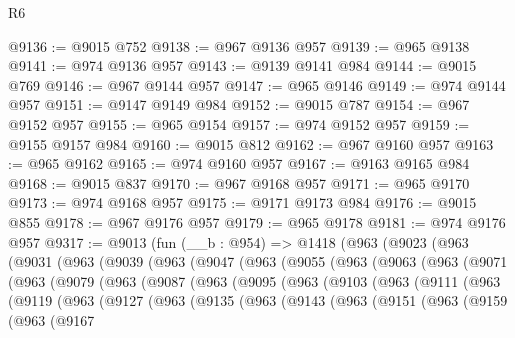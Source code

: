 \begin{lexlean}{R6}
\begin{coremodule}
@9136 := @9015 @752
@9138 := @967 @9136 @957
@9139 := @965 @9138
@9141 := @974 @9136 @957
@9143 := @9139 @9141 @984
@9144 := @9015 @769
@9146 := @967 @9144 @957
@9147 := @965 @9146
@9149 := @974 @9144 @957
@9151 := @9147 @9149 @984
@9152 := @9015 @787
@9154 := @967 @9152 @957
@9155 := @965 @9154
@9157 := @974 @9152 @957
@9159 := @9155 @9157 @984
@9160 := @9015 @812
@9162 := @967 @9160 @957
@9163 := @965 @9162
@9165 := @974 @9160 @957
@9167 := @9163 @9165 @984
@9168 := @9015 @837
@9170 := @967 @9168 @957
@9171 := @965 @9170
@9173 := @974 @9168 @957
@9175 := @9171 @9173 @984
@9176 := @9015 @855
@9178 := @967 @9176 @957
@9179 := @965 @9178
@9181 := @974 @9176 @957
@9317 := @9013
    (fun (__b : @954) =>
    @1418
      (@963
        (@9023
          (@963
            (@9031
              (@963
                (@9039
                  (@963
                    (@9047
                      (@963
                        (@9055
                          (@963
                            (@9063
                              (@963
                                (@9071
                                  (@963
                                    (@9079
                                      (@963
                                        (@9087
                                          (@963
                                            (@9095
                                              (@963
                                                (@9103
                                                  (@963
                                                    (@9111
                                                      (@963
                                                        (@9119
                                                          (@963
                                                            (@9127
                                                              (@963
                                                                (@9135
                                                                  (@963
                                                                    (@9143
                                                                      (@963
                                                                        (@9151
                                                                          (@963
                                                                            (@9159
                                                                              (@963
                                                                                (@9167

\end{coremodule}
\end{lexlean}
